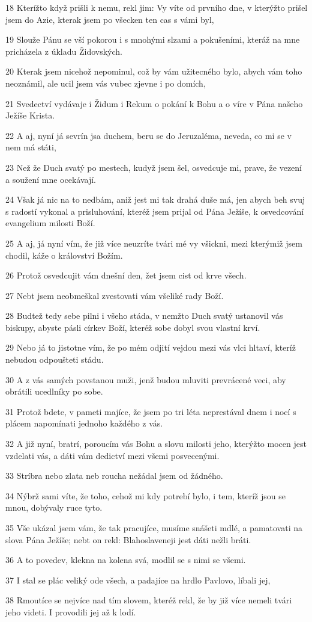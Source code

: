 \par 18 Kterížto když prišli k nemu, rekl jim: Vy víte od prvního dne, v kterýžto prišel jsem do Azie, kterak jsem po všecken ten cas s vámi byl,
\par 19 Slouže Pánu se vší pokorou i s mnohými slzami a pokušeními, kteráž na mne pricházela z úkladu Židovských.
\par 20 Kterak jsem nicehož nepominul, což by vám užitecného bylo, abych vám toho neoznámil, ale ucil jsem vás vubec zjevne i po domích,
\par 21 Svedectví vydávaje i Židum i Rekum o pokání k Bohu a o víre v Pána našeho Ježíše Krista.
\par 22 A aj, nyní já sevrín jsa duchem, beru se do Jeruzaléma, neveda, co mi se v nem má státi,
\par 23 Než že Duch svatý po mestech, kudyž jsem šel, osvedcuje mi, prave, že vezení a soužení mne ocekávají.
\par 24 Však já nic na to nedbám, aniž jest mi tak drahá duše má, jen abych beh svuj s radostí vykonal a prisluhování, kteréž jsem prijal od Pána Ježíše, k osvedcování evangelium milosti Boží.
\par 25 A aj, já nyní vím, že již více neuzríte tvári mé vy všickni, mezi kterýmiž jsem chodil, káže o království Božím.
\par 26 Protož osvedcujit vám dnešní den, žet jsem cist od krve všech.
\par 27 Nebt jsem neobmeškal zvestovati vám všeliké rady Boží.
\par 28 Budtež tedy sebe pilni i všeho stáda, v nemžto Duch svatý ustanovil vás biskupy, abyste pásli církev Boží, kteréž sobe dobyl svou vlastní krví.
\par 29 Nebo já to jistotne vím, že po mém odjití vejdou mezi vás vlci hltaví, kteríž nebudou odpoušteti stádu.
\par 30 A z vás samých povstanou muži, jenž budou mluviti prevrácené veci, aby obrátili ucedlníky po sobe.
\par 31 Protož bdete, v pameti majíce, že jsem po tri léta neprestával dnem i nocí s plácem napomínati jednoho každého z vás.
\par 32 A již nyní, bratrí, poroucím vás Bohu a slovu milosti jeho, kterýžto mocen jest vzdelati vás, a dáti vám dedictví mezi všemi posvecenými.
\par 33 Stríbra nebo zlata neb roucha nežádal jsem od žádného.
\par 34 Nýbrž sami víte, že toho, cehož mi kdy potrebí bylo, i tem, kteríž jsou se mnou, dobývaly ruce tyto.
\par 35 Vše ukázal jsem vám, že tak pracujíce, musíme snášeti mdlé, a pamatovati na slova Pána Ježíše; nebt on rekl: Blahoslaveneji jest dáti nežli bráti.
\par 36 A to povedev, klekna na kolena svá, modlil se s nimi se všemi.
\par 37 I stal se plác veliký ode všech, a padajíce na hrdlo Pavlovo, líbali jej,
\par 38 Rmoutíce se nejvíce nad tím slovem, kteréž rekl, že by již více nemeli tvári jeho videti. I provodili jej až k lodí.


